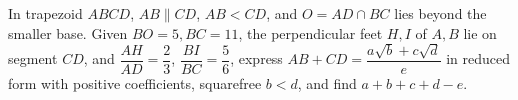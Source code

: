 In trapezoid $ABCD$, $AB\parallel CD$, $AB<CD$, and $O=AD\cap BC$ lies beyond the smaller base. Given $BO=5,BC=11$, the perpendicular feet $H,I$ of $A,B$ lie on segment $CD$, and $\dfrac{AH}{AD}=\dfrac{2}{3}$, $\dfrac{BI}{BC}=\dfrac{5}{6}$, express $AB+CD=\dfrac{a\sqrt b+c\sqrt d}{e}$ in reduced form with positive coefficients, squarefree $b<d$, and find $a+b+c+d-e$.
